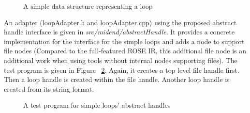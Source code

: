 \begin{figure}[!h]
{\indent
{\mySmallestFontSize
\begin{latexonly}
  
\end{latexonly}

\begin{htmlonly}
   
\end{htmlonly}

}
}
\caption{A simple data structure representing a loop}
\label{Tutorial:myloop}
\end{figure}


An adapter (loopAdapter.h and loopAdapter.cpp) using the proposed abstract
handle interface is given in \textit{src/midend/abstractHandle}.
It provides a concrete implementation for the interface for the simple loops and adds a
node to support file nodes (Compared to the full-featured ROSE IR, this
additional file node is an additional work when using tools without internal nodes
supporting files). 
The test program is given in Figure ~\ref{Tutorial:testMyLoop}.
Again, it creates a top level file handle first. Then a loop handle is
created within the file handle. Another loop handle is created from its 
string format. 
\begin{figure}[!h]
{\indent
{\mySmallestFontSize
\begin{latexonly}
  
\end{latexonly}

\begin{htmlonly}
   
\end{htmlonly}

}
}
\caption{A test program for simple loops' abstract handles}
\label{Tutorial:testMyLoop}
\end{figure}


